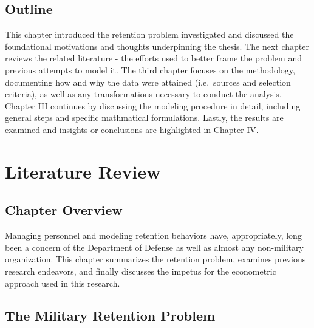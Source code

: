\documentclass[12pt,letterpaper,toc=flat,oneside]{report}
\theoremstyle{definition}
\theoremstyle{definition}
\theoremstyle{definition}
\theoremstyle{remark}
\begin{document}
\hypertarget{outline}{%
\section{Outline}\label{outline}}

This chapter introduced the retention problem investigated and discussed
the foundational motivations and thoughts underpinning the thesis. The
next chapter reviews the related literature - the efforts used to better
frame the problem and previous attempts to model it. The third chapter
focuses on the methodology, documenting how and why the data were
attained (i.e.~sources and selection criteria), as well as any
transformations necessary to conduct the analysis. Chapter III continues
by discussing the modeling procedure in detail, including general steps
and specific mathmatical formulations. Lastly, the results are examined
and insights or conclusions are highlighted in Chapter IV.

\newpage

\hypertarget{literature-review}{%
\chapter{Literature Review}\label{literature-review}}

\hypertarget{chapter-overview}{%
\section{Chapter Overview}\label{chapter-overview}}

Managing personnel and modeling retention behaviors have, appropriately,
long been a concern of the Department of Defense as well as almost any
non-military organization. This chapter summarizes the retention
problem, examines previous research endeavors, and finally discusses the
impetus for the econometric approach used in this research.

\hypertarget{the-military-retention-problem}{%
\section{The Military Retention
Problem}\label{the-military-retention-problem}}
\end{document}
